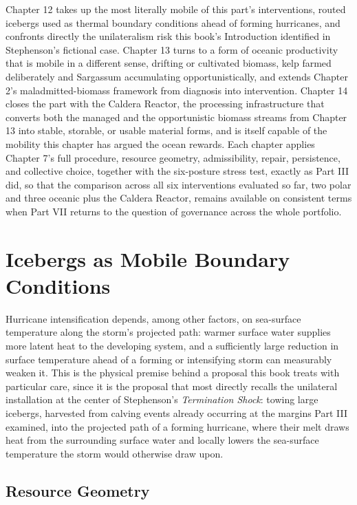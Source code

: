 \documentclass[11pt,oneside]{book}
\begin{document}
Chapter 12 takes up the most literally mobile of this part's interventions, routed icebergs used as thermal boundary conditions ahead of forming hurricanes, and confronts directly the unilateralism risk this book's Introduction identified in Stephenson's fictional case. Chapter 13 turns to a form of oceanic productivity that is mobile in a different sense, drifting or cultivated biomass, kelp farmed deliberately and Sargassum accumulating opportunistically, and extends Chapter 2's maladmitted-biomass framework from diagnosis into intervention. Chapter 14 closes the part with the Caldera Reactor, the processing infrastructure that converts both the managed and the opportunistic biomass streams from Chapter 13 into stable, storable, or usable material forms, and is itself capable of the mobility this chapter has argued the ocean rewards. Each chapter applies Chapter 7's full procedure, resource geometry, admissibility, repair, persistence, and collective choice, together with the six-posture stress test, exactly as Part III did, so that the comparison across all six interventions evaluated so far, two polar and three oceanic plus the Caldera Reactor, remains available on consistent terms when Part VII returns to the question of governance across the whole portfolio.

\chapter{Icebergs as Mobile Boundary Conditions}

Hurricane intensification depends, among other factors, on sea-surface temperature along the storm's projected path: warmer surface water supplies more latent heat to the developing system, and a sufficiently large reduction in surface temperature ahead of a forming or intensifying storm can measurably weaken it. This is the physical premise behind a proposal this book treats with particular care, since it is the proposal that most directly recalls the unilateral installation at the center of Stephenson's \textit{Termination Shock}: towing large icebergs, harvested from calving events already occurring at the margins Part III examined, into the projected path of a forming hurricane, where their melt draws heat from the surrounding surface water and locally lowers the sea-surface temperature the storm would otherwise draw upon.

\section*{Resource Geometry}
\end{document}
